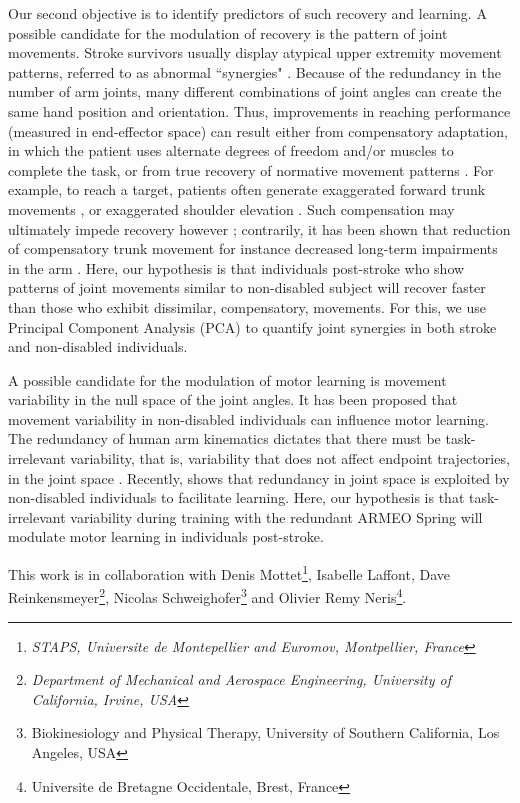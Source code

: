 Our second objective is to identify predictors of such recovery and learning. 
A possible candidate for the modulation of recovery is the pattern of joint movements. 
Stroke survivors usually display atypical upper extremity movement patterns, referred to as abnormal ``synergies" \cite{Brunnstroem1970}. 
Because of the redundancy in the number of arm joints, many different combinations of joint angles can create the same hand position and orientation. 
Thus, improvements in reaching performance (measured in end-effector space) can result either from compensatory adaptation, in which the patient uses alternate degrees of freedom and/or muscles to complete the task, or from true recovery of normative movement patterns \cite{Roby-Brami2003}. 
For example, to reach a target, patients often generate exaggerated forward trunk movements \cite{Roby-Brami2003}, or exaggerated shoulder elevation \cite{Steenbergen2000}.  
Such compensation may ultimately impede recovery however \cite{Roby-Brami2003}; contrarily, it has been shown that reduction of compensatory trunk movement for instance decreased long-term impairments in the arm \cite{Michaelsen2006}. 
Here, our hypothesis is that individuals post-stroke who show patterns of joint movements similar to non-disabled subject will recover faster than those who exhibit dissimilar, compensatory, movements.
For this, we use Principal Component Analysis (PCA) to quantify joint synergies \cite{Kordelaar2012} in both stroke and non-disabled individuals.

A possible candidate for the modulation of motor learning is movement variability in the null space of the joint angles. 
It has been proposed that movement variability in non-disabled individuals can influence motor learning. 
The redundancy of human arm kinematics dictates that there must be task-irrelevant variability, that is, variability that does not affect endpoint trajectories, in the joint space \cite{Scholz1999}. 
Recently, \cite{Singh2016} shows that redundancy in joint space is exploited by non-disabled individuals to facilitate learning. 
Here, our hypothesis is that task-irrelevant variability during training with the redundant ARMEO Spring will modulate motor learning in individuals post-stroke.

This work is in collaboration with Denis Mottet\footnote{\label{montepellier}\textit{STAPS, Universite de Montepellier and Euromov, Montpellier, France}}, Isabelle Laffont\footnotemark[\ref{montepellier}], Dave Reinkensmeyer\footnote{\textit{Department of Mechanical and Aerospace Engineering, University of California, Irvine, USA}}, Nicolas Schweighofer\footnote{Biokinesiology and Physical Therapy, University of Southern California, Los Angeles, USA} and Olivier Remy Neris\footnote{Universite de Bretagne Occidentale, Brest, France}. 


